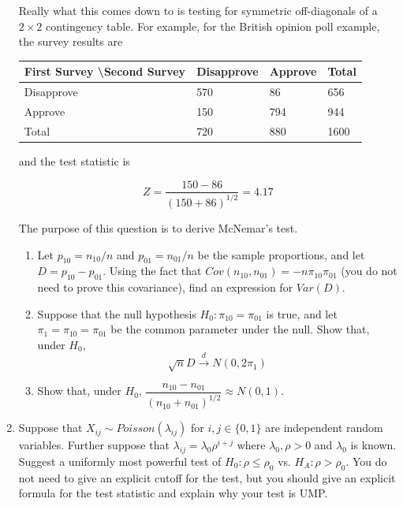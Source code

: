\documentclass[11pt]{article}
\begin{document}
\begin{enumerate}
Really what this comes down to is testing for symmetric off-diagonals of a $2 \times 2$ contingency table. For example, for the British opinion poll example, the survey results are

\begin{center}
\begin{tabular}{l|lll}
\hline
First Survey \textbackslash Second Survey & Disapprove & Approve & Total \\ \hline
Disapprove                                & 570        & 86      & 656   \\
Approve                                   & 150        & 794     & 944   \\
Total                                     & 720        & 880     & 1600  \\ \hline
\end{tabular}
\end{center}

and the test statistic is

$$Z = \dfrac{150 - 86}{(150 + 86)^{1/2}} = 4.17$$

The purpose of this question is to derive McNemar's test.

\begin{enumerate}
\item Let $p_{10} = n_{10}/n$ and $p_{01} = n_{01}/n$ be the sample proportions, and let $D = p_{10} - p_{01}$. Using the fact that $Cov(n_{10}, n_{01}) = -n\pi_{10}\pi_{01}$ (you do not need to prove this covariance), find an expression for $Var(D)$.

\item Suppose that the null hypothesis $H_0: \pi_{10} = \pi_{01}$ is true, and let $\pi_1 = \pi_{10} = \pi_{01}$ be the common parameter under the null. Show that, under $H_0$, 
$$\sqrt{n} D \overset{d}{\to} N(0, 2 \pi_1)$$

\item Show that, under $H_0$, $\dfrac{n_{10} - n_{01}}{(n_{10} + n_{01})^{1/2}} \approx N(0, 1)$.
\end{enumerate}


\bigskip

\item Suppose that $X_{ij} \sim Poisson(\lambda_{ij})$ for $i,j \in \{0, 1\}$ are independent random variables. Further suppose that $\lambda_{ij} = \lambda_0 \rho^{i+j}$ where $\lambda_0, \rho > 0$ and $\lambda_0$ is known. Suggest a uniformly most powerful test of $H_0: \rho \leq \rho_0$ vs. $H_A: \rho > \rho_0$. You do not need to give an explicit cutoff for the test, but you should give an explicit formula for the test statistic and explain why your test is UMP.


\end{enumerate}
\end{document}
